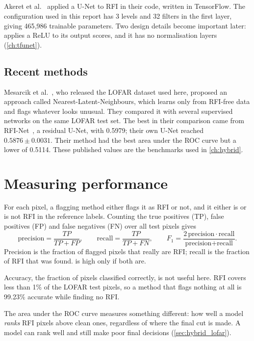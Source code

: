 \subsection{\tfunet{}}
Akeret et al.~\cite{akeret2017} applied a U-Net to RFI in their \tfunet{}
code, written in TensorFlow. The configuration used in this report has 3
levels and 32 filters in the first layer, giving 465{,}986 trainable
parameters. Two design details become important later: \tfunet{} applies a ReLU
to its output scores, and it has no normalisation layers
(\cref{ch:tfunet}).

\subsection{Recent methods}
Mesarcik et al.~\cite{mesarcik2022}, who released the LOFAR dataset used here,
proposed an approach called Nearest-Latent-Neighbours, which learns only from
RFI-free data and flags whatever looks unusual. They compared it with several
supervised networks on the same LOFAR test set. The best \Fone{} in their
comparison came from RFI-Net~\cite{yang2020rfinet}, a residual U-Net, with
0.5979; their own U-Net reached $0.5876 \pm 0.0031$. Their method had the best
area under the ROC curve but a lower \Fone{} of 0.5114. These published values
are the benchmarks used in \cref{ch:hybrid}.

\section{Measuring performance}
\label{sec:metrics}
For each pixel, a flagging method either flags it as RFI or not, and it either
is or is not RFI in the reference labels. Counting the true positives (TP),
false positives (FP) and false negatives (FN) over all test pixels gives
\begin{equation}
  \text{precision} = \frac{TP}{TP + FP}, \qquad
  \text{recall} = \frac{TP}{TP + FN}, \qquad
  F_1 = \frac{2\,\text{precision}\cdot\text{recall}}{\text{precision} + \text{recall}}.
\end{equation}
Precision is the fraction of flagged pixels that really are RFI; recall is the
fraction of RFI that was found. \Fone{} is high only if both are.

Accuracy, the fraction of pixels classified correctly, is not useful here.
RFI covers less than 1\% of the LOFAR test pixels, so a method that flags
nothing at all is 99.23\% accurate while finding no RFI.

The area under the ROC curve measures something different: how well a model
\emph{ranks} RFI pixels above clean ones, regardless of where the final cut is
made. A model can rank well and still make poor final decisions
(\cref{sec:hybrid_lofar}).

